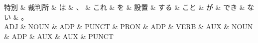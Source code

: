 \documentclass[tikz,border=5pt]{standalone}
\begin{document}
\normalsize
\begin{dependency}[edge unit distance=12.0pt]
    \begin{deptext}[column sep=1em]
        特別 \& 裁判所 \& は \& 、 \& これ \& を \& 設置 \& する \& こと \& が \& でき \& ない \& 。\\
        ADJ \& NOUN \& ADP \& PUNCT \& PRON \& ADP \& VERB \& AUX \& NOUN \& ADP \& AUX \& AUX \& PUNCT\\
    \end{deptext}
\end{dependency}
\end{document}

